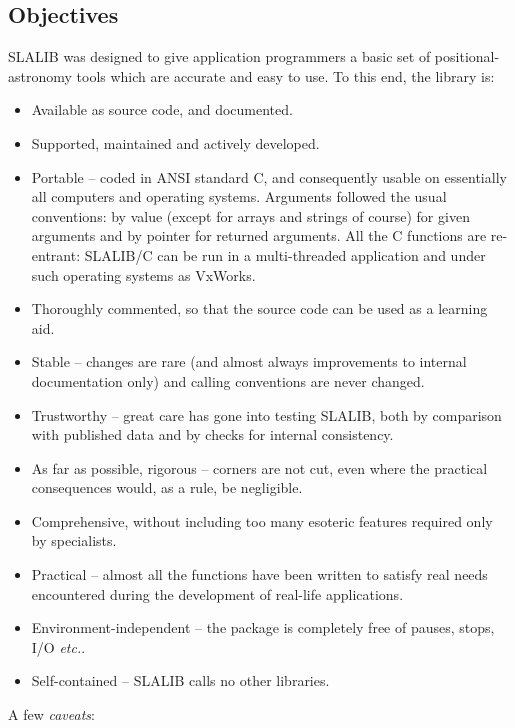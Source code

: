 \documentclass[11pt,fleqn,twoside]{article}
\renewcommand{\_}{{\tt\char'137}}     %
\begin{document}
\subsection{Objectives}
SLALIB was designed to give application programmers
a basic set of positional-astronomy tools which are
accurate and easy to use.  To this end, the library is:
\begin{itemize}
\item Available as source code, and documented.
\item Supported, maintained and actively developed.
\item Portable -- coded in ANSI standard C, and consequently
usable on essentially all computers and operating systems.
Arguments followed the usual conventions: by value
(except for arrays and strings of course)
for given arguments and by pointer for returned arguments.
All the C functions are re-entrant: SLALIB/C can be run in a multi-threaded
application and under such operating systems as VxWorks.
\item Thoroughly commented, so that the source code can be used as
a learning aid.
\item Stable -- changes are rare (and almost always improvements to
internal documentation only) and calling conventions are never changed.
\item Trustworthy -- great care has gone into
testing SLALIB, both by comparison with published data and
by checks for internal consistency.
\item As far as possible, rigorous -- corners are not cut,
even where the practical consequences would, as a rule, be
negligible.
\item Comprehensive, without including too many esoteric features
required only by specialists.
\item Practical -- almost all the functions have been written to
satisfy real needs encountered during the development of
real-life applications.
\item Environment-independent -- the package is
completely free of pauses, stops, I/O {\it etc.}.
\item Self-contained -- SLALIB calls no other libraries.
\end{itemize}
A few {\it caveats}:
\end{document}
